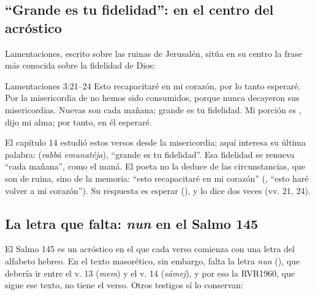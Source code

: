 \subsection{“Grande es tu fidelidad”: en el centro del acróstico}
Lamentaciones, escrito sobre las ruinas de Jerusalén, sitúa en su centro la frase más conocida sobre la fidelidad de Dios:

\begin{verso}{Lamentaciones 3:21–24}
Esto recapacitaré en mi corazón, por lo tanto esperaré. Por la misericordia de \SENOR{} no hemos sido consumidos, porque nunca decayeron sus misericordias. Nuevas son cada mañana; grande es tu fidelidad. Mi porción es \SENOR, dijo mi alma; por tanto, en él esperaré.
\end{verso}

El capítulo 14 estudió estos versos desde la misericordia; aquí interesa su última palabra:  (\emph{rabbá emunatéja}), ``grande es tu fidelidad''. Esa fidelidad se renueva ``cada mañana'', como el maná. El poeta no la deduce de las circunstancias, que son de ruina, sino de la memoria: ``esto recapacitaré en mi corazón'' (, ``esto haré volver a mi corazón''). Su respuesta es esperar (), y lo dice dos veces (vv. 21, 24).


\subsection{La letra que falta: \emph{nun} en el Salmo 145}
El Salmo 145 es un acróstico en el que cada verso comienza con una letra del alfabeto hebreo. En el texto masorético, sin embargo, falta la letra \emph{nun} (), que debería ir entre el v. 13 (\emph{mem}) y el v. 14 (\emph{sámej}), y por eso la RVR1960, que sigue ese texto, no tiene el verso. Otros testigos sí lo conservan:

